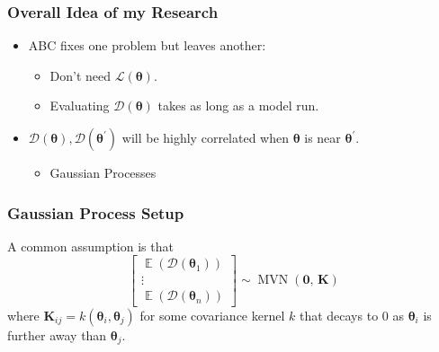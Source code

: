 \documentclass{beamer}
\DeclareMathOperator{\E}{\mathbb{E}}
\DeclareMathOperator{\MVN}{MVN}
\begin{document}
\begin{frame}
    \frametitle{Overall Idea of my Research}
    \begin{itemize}
        \item ABC fixes one problem but leaves another:
              \begin{itemize}
                  \item Don't need $\mathcal{L}(\bm{\theta}).$
                  \item Evaluating $\mathcal{D}(\bm{\theta})$ takes as long as
                        a model run.
              \end{itemize}
        \item <2-> $\mathcal{D}(\bm{\theta}), \mathcal{D}(\bm{\theta}^\prime)$
              will be highly correlated when $\bm{\theta}$ is near
              $\bm{\theta}^\prime.$
              \begin{itemize}
                  \item Gaussian Processes
              \end{itemize}
    \end{itemize}
\end{frame}

\begin{frame}
    \frametitle{Gaussian Process Setup}

    A common assumption is that
    $$\begin{bmatrix}
            \E(\mathcal{D}(\bm{\theta}_1)) \\
            \vdots                         \\
            \E(\mathcal{D}(\bm{\theta}_n))
        \end{bmatrix} \sim
        \MVN\left(\mathbf{0},\, \mathbf{K}\right)$$
    where $\mathbf{K}_{ij} = k(\bm{\theta}_i, \bm{\theta}_j)$ for some
    covariance kernel $k$ that decays to 0 as $\bm{\theta}_i$ is further away
    than $\bm{\theta}_j.$
\end{frame}

\end{document}
